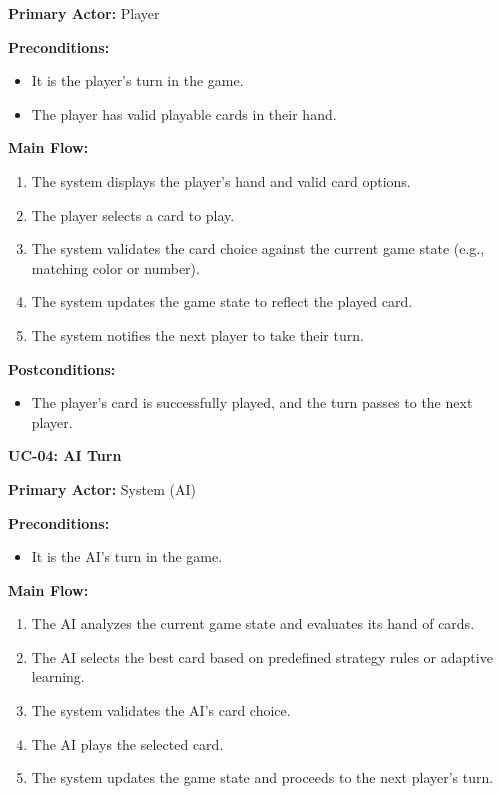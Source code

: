 \documentclass{article}
\begin{document}
\textbf{Primary Actor:} Player

\textbf{Preconditions:}
\begin{itemize}
    \item It is the player's turn in the game.
    \item The player has valid playable cards in their hand.
\end{itemize}

\textbf{Main Flow:}
\begin{enumerate}
    \item The system displays the player's hand and valid card options.
    \item The player selects a card to play.
    \item The system validates the card choice against the current game state (e.g., matching color or number).
    \item The system updates the game state to reflect the played card.
    \item The system notifies the next player to take their turn.
\end{enumerate}

\textbf{Postconditions:}
\begin{itemize}
    \item The player's card is successfully played, and the turn passes to the next player.
\end{itemize}

\textbf{UC-04: AI Turn}

\textbf{Primary Actor:} System (AI)

\textbf{Preconditions:}
\begin{itemize}
    \item It is the AI's turn in the game.
\end{itemize}

\textbf{Main Flow:}
\begin{enumerate}
    \item The AI analyzes the current game state and evaluates its hand of cards.
    \item The AI selects the best card based on predefined strategy rules or adaptive learning.
    \item The system validates the AI's card choice.
    \item The AI plays the selected card.
    \item The system updates the game state and proceeds to the next player's turn.
\end{enumerate}
\end{document}
